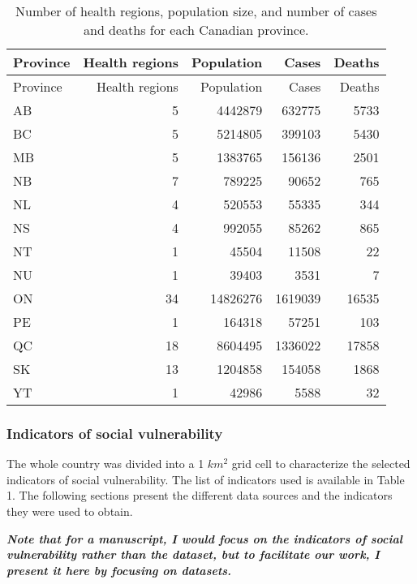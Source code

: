 \documentclass[preprint, 3p,
authoryear]{elsarticle} %
\begin{document}
\begin{longtable}[]{@{}lrrrr@{}}
\caption{Number of health regions, population size, and number of cases
and deaths for each Canadian province.}\tabularnewline
\toprule
Province & Health regions & Population & Cases & Deaths \\
\midrule
\endfirsthead
\toprule
Province & Health regions & Population & Cases & Deaths \\
\midrule
\endhead
AB & 5 & 4442879 & 632775 & 5733 \\
BC & 5 & 5214805 & 399103 & 5430 \\
MB & 5 & 1383765 & 156136 & 2501 \\
NB & 7 & 789225 & 90652 & 765 \\
NL & 4 & 520553 & 55335 & 344 \\
NS & 4 & 992055 & 85262 & 865 \\
NT & 1 & 45504 & 11508 & 22 \\
NU & 1 & 39403 & 3531 & 7 \\
ON & 34 & 14826276 & 1619039 & 16535 \\
PE & 1 & 164318 & 57251 & 103 \\
QC & 18 & 8604495 & 1336022 & 17858 \\
SK & 13 & 1204858 & 154058 & 1868 \\
YT & 1 & 42986 & 5588 & 32 \\
\bottomrule
\end{longtable}

\hypertarget{indicators-of-social-vulnerability}{%
\subsubsection{Indicators of social
vulnerability}\label{indicators-of-social-vulnerability}}

The whole country was divided into a 1 \(km^2\) grid cell to
characterize the selected indicators of social vulnerability. The list
of indicators used is available in Table 1. The following sections
present the different data sources and the indicators they were used to
obtain.

\textbf{\emph{Note that for a manuscript, I would focus on the
indicators of social vulnerability rather than the dataset, but to
facilitate our work, I present it here by focusing on datasets.}}
\end{document}
